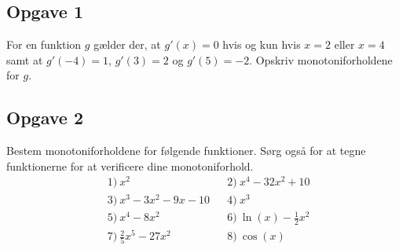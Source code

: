 \subsection*{Opgave 1}
For en funktion $g$ gælder der, at $g'(x) = 0$ hvis og kun hvis $x = 2$ eller $x = 4$ samt at $g'(-4) = 1$, $g'(3) = 2$ og $g'(5) = -2$. Opskriv monotoniforholdene for $g$.

\subsection*{Opgave 2}
Bestem monotoniforholdene for følgende funktioner. Sørg også for at tegne funktionerne for at verificere dine monotoniforhold. 
\begin{align*}
&1) \ x^2   &&2)\  x^4 - 32x^2 + 10 \\
&3) \ x^3 - 3x^2 - 9x -10 &&4)\ x^3 \\
&5) \ x^4-8x^2 &&6)\ \ln(x) -\frac{1}{2}x^2 \\
&7) \ \frac{2}{5}x^5-27x^2  &&8)\ \cos(x)  
\end{align*}